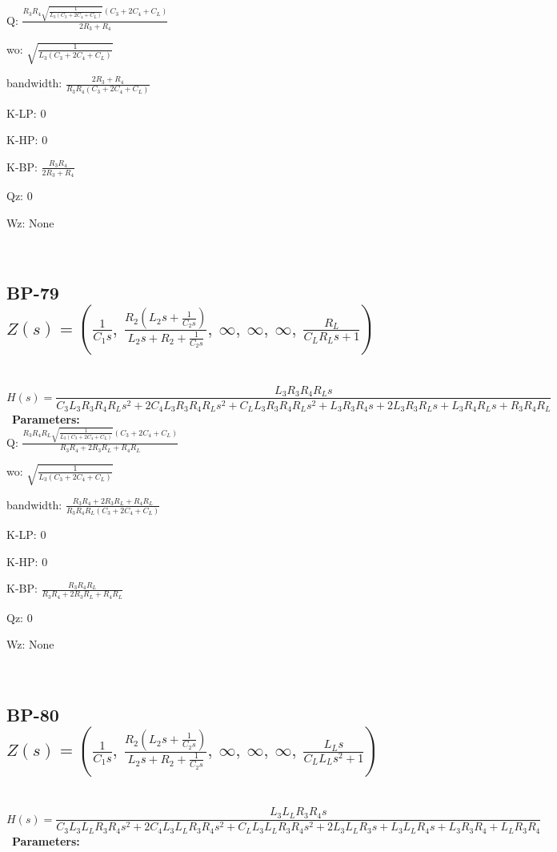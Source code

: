 \documentclass{article}
\begin{document}
Q: $\frac{R_{3} R_{4} \sqrt{\frac{1}{L_{3} \left(C_{3} + 2 C_{4} + C_{L}\right)}} \left(C_{3} + 2 C_{4} + C_{L}\right)}{2 R_{3} + R_{4}}$\ 

wo: $\sqrt{\frac{1}{L_{3} \left(C_{3} + 2 C_{4} + C_{L}\right)}}$\ 

bandwidth: $\frac{2 R_{3} + R_{4}}{R_{3} R_{4} \left(C_{3} + 2 C_{4} + C_{L}\right)}$\ 

K-LP: $0$\ 

K-HP: $0$\ 

K-BP: $\frac{R_{3} R_{4}}{2 R_{3} + R_{4}}$\ 

Qz: $0$\ 

Wz: $\text{None}$\ 

\ 

\subsection{BP-79 $Z(s) = \left( \frac{1}{C_{1} s}, \  \frac{R_{2} \left(L_{2} s + \frac{1}{C_{2} s}\right)}{L_{2} s + R_{2} + \frac{1}{C_{2} s}}, \  \infty, \  \infty, \  \infty, \  \frac{R_{L}}{C_{L} R_{L} s + 1}\right)$ } \ 
\textbf{\[H(s) = \frac{L_{3} R_{3} R_{4} R_{L} s}{C_{3} L_{3} R_{3} R_{4} R_{L} s^{2} + 2 C_{4} L_{3} R_{3} R_{4} R_{L} s^{2} + C_{L} L_{3} R_{3} R_{4} R_{L} s^{2} + L_{3} R_{3} R_{4} s + 2 L_{3} R_{3} R_{L} s + L_{3} R_{4} R_{L} s + R_{3} R_{4} R_{L}}\] } \ 
\textbf{Parameters:}\\ 

Q: $\frac{R_{3} R_{4} R_{L} \sqrt{\frac{1}{L_{3} \left(C_{3} + 2 C_{4} + C_{L}\right)}} \left(C_{3} + 2 C_{4} + C_{L}\right)}{R_{3} R_{4} + 2 R_{3} R_{L} + R_{4} R_{L}}$\ 

wo: $\sqrt{\frac{1}{L_{3} \left(C_{3} + 2 C_{4} + C_{L}\right)}}$\ 

bandwidth: $\frac{R_{3} R_{4} + 2 R_{3} R_{L} + R_{4} R_{L}}{R_{3} R_{4} R_{L} \left(C_{3} + 2 C_{4} + C_{L}\right)}$\ 

K-LP: $0$\ 

K-HP: $0$\ 

K-BP: $\frac{R_{3} R_{4} R_{L}}{R_{3} R_{4} + 2 R_{3} R_{L} + R_{4} R_{L}}$\ 

Qz: $0$\ 

Wz: $\text{None}$\ 

\ 

\subsection{BP-80 $Z(s) = \left( \frac{1}{C_{1} s}, \  \frac{R_{2} \left(L_{2} s + \frac{1}{C_{2} s}\right)}{L_{2} s + R_{2} + \frac{1}{C_{2} s}}, \  \infty, \  \infty, \  \infty, \  \frac{L_{L} s}{C_{L} L_{L} s^{2} + 1}\right)$ } \ 
\textbf{\[H(s) = \frac{L_{3} L_{L} R_{3} R_{4} s}{C_{3} L_{3} L_{L} R_{3} R_{4} s^{2} + 2 C_{4} L_{3} L_{L} R_{3} R_{4} s^{2} + C_{L} L_{3} L_{L} R_{3} R_{4} s^{2} + 2 L_{3} L_{L} R_{3} s + L_{3} L_{L} R_{4} s + L_{3} R_{3} R_{4} + L_{L} R_{3} R_{4}}\] } \ 
\textbf{Parameters:}\\ 
\end{document}
